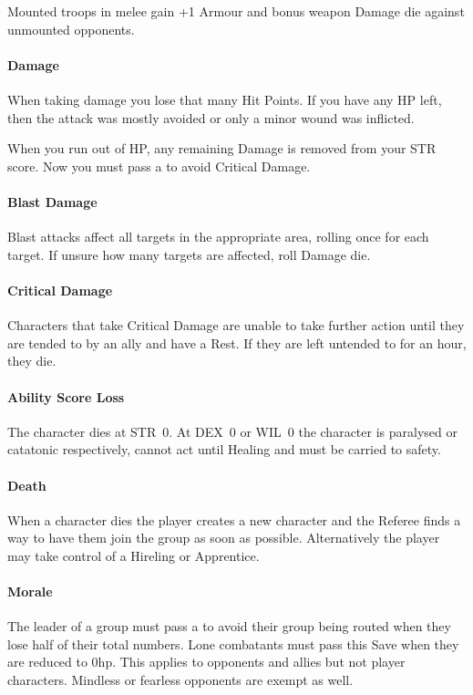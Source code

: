 \documentclass[itdr]{subfiles}
\begin{document}
Mounted troops in melee gain +1 Armour and bonus weapon Damage die against unmounted opponents.

\paragraph{Damage}
When taking damage you lose that many Hit Points. If you have any HP left, then the attack was mostly avoided or only a minor wound was inflicted.

When you run out of HP, any remaining Damage is removed from your STR score. Now you must pass a  to avoid Critical Damage.

\paragraph{Blast Damage}
Blast attacks affect all targets in the appropriate area, rolling once for each target. If unsure how many targets are affected, roll Damage die.

\paragraph{Critical Damage}
Characters that take Critical Damage are unable to take further action until they are tended to by an ally and have a Rest. If they are left untended to for an hour, they die.

\paragraph{Ability Score Loss}
The character dies at STR~0. At DEX~0 or WIL~0 the character is paralysed or catatonic respectively, cannot act until Healing and must be carried to safety.

\paragraph{Death}
When a character dies the player creates a new character and the Referee finds a way to have them join the group as soon as possible. Alternatively the player may take control of a Hireling or Apprentice.

\paragraph{Morale}
The leader of a group must pass a  to avoid their group being routed when they lose half of their total numbers. Lone combatants must pass this Save when they are reduced to 0hp. This applies to opponents and allies but not player characters. Mindless or fearless opponents are exempt as well.
\end{document}
